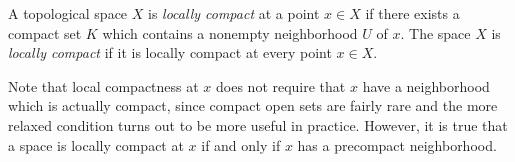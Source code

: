 \documentclass[12pt]{article}
\begin{document}
A topological space $X$ is {\em locally compact} at a point $x \in X$ if there exists a compact set $K$ which contains a nonempty neighborhood $U$ of $x$. The space $X$ is {\em locally compact} if it is locally compact at every point $x \in X$.

Note that local compactness at $x$ does not require that $x$ have a neighborhood which is actually compact, since compact open sets are fairly rare and the more relaxed condition turns out to be more useful in practice. However, it is true that a space is locally compact at $x$ if and only if $x$ has a precompact neighborhood.
\end{document}
